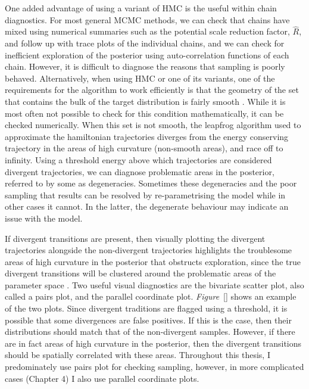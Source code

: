 One added advantage of using a variant of HMC is the useful within chain diagnostics. For most general MCMC methods, we can check that chains have mixed using numerical summaries such as the potential scale reduction factor, $\hat{R}$, and follow up with trace plots of the individual chains, and we can check for inefficient exploration of the posterior using auto-correlation functions of each chain. However, it is difficult to diagnose the reasons that sampling is poorly behaved. Alternatively, when using HMC or one of its variants, one of the requirements for the algorithm to work efficiently is that the geometry of the set that contains the bulk of the target distribution is fairly smooth \citep{gabry_2019}. While it is most often not possible to check for this condition mathematically, it can be checked numerically. When this set is not smooth, the leapfrog algorithm used to approximate the hamiltonian trajectories diverges from the energy conserving trajectory in the areas of high curvature (non-smooth areas), and race off to infinity. Using a threshold energy above which trajectories are considered divergent trajectories, we can diagnose problematic areas in the posterior\citep{gabry_2019}, referred to by some as degeneracies\citep{betancourt_2020}. Sometimes these degeneracies and the poor sampling that results can be resolved by re-parametrising the model \citep{betancourt_2013} while in other cases it cannot. In the latter, the degenerate behaviour may indicate an issue with the model.

\begin{figure}
  
\end{figure}

If divergent transitions are present, then visually plotting the divergent trajectories alongside the non-divergent trajectories highlights the troublesome areas of high curvature in the posterior that obstructs exploration, since the true divergent transitions will be clustered around the problematic areas of the parameter space \citep{gabry_2019}. Two useful visual diagnostics are the bivariate scatter plot, also called a pairs plot, and the parallel coordinate plot. \textit{Figure}~\ref{} shows an example of the two plots. Since divergent traditions are flagged using a threshold, it is possible that some divergences are false positives. If this is the case, then their distributions should match that of the non-divergent samples. However, if there are in fact areas of high curvature in the posterior, then the divergent transitions should be spatially correlated with these areas. Throughout this thesis, I predominately use pairs plot for checking sampling, however, in more complicated cases (Chapter 4) I also use parallel coordinate plots.

